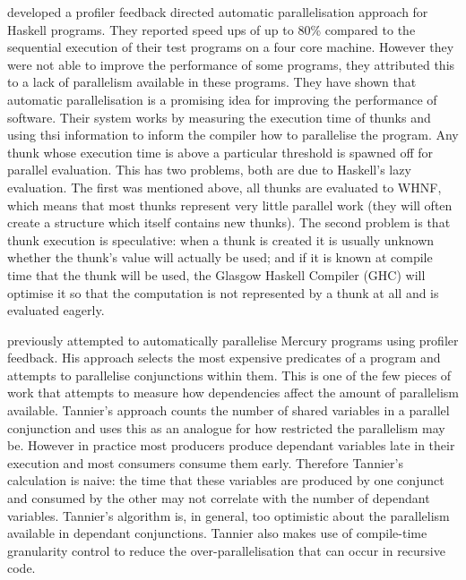 \citet*{harris_07_feedback_imp_par} developed a profiler
feedback directed automatic parallelisation approach for Haskell programs.
They reported speed ups of up to 80\% compared to the sequential
execution of their test programs on a four core machine.
However they were not able to improve the performance of some
programs, they attributed this to a lack of parallelism
available in these programs.
They have shown that automatic parallelisation is a promising idea for
improving the performance of software.
Their system works by measuring the execution time of thunks and using
thsi information to inform the compiler how to parallelise the program.
Any thunk whose execution time is above a particular threshold is
spawned off for parallel evaluation.
This has two problems, both are due to Haskell's lazy evaluation.
The first was mentioned above, all thunks are evaluated to WHNF,
which means that most thunks represent very little parallel work
(they will often create a structure which itself contains new thunks).
The second problem is that thunk execution is speculative:
when a thunk is created it is usually unknown whether the thunk's value
will actually be used;
and if it is known at compile time that the thunk will be used,
the Glasgow Haskell Compiler (GHC) will optimise it so that the computation
is not represented by a thunk at all and is evaluated eagerly.

\citet*{tannier:2007:parallel_mercury} previously attempted to automatically
parallelise Mercury programs using profiler feedback.
His approach selects the most expensive predicates
of a program and attempts to parallelise conjunctions within them.
This is one of the few pieces of work that attempts to measure how
dependencies affect the amount of parallelism available.
Tannier's approach counts the number of shared variables in a parallel
conjunction and uses this as an analogue for how restricted the
parallelism may be.
However in practice most producers produce dependant variables late in
their execution and most consumers consume them early.
Therefore Tannier's calculation is naive:
the time that these variables are produced by one conjunct and consumed
by the other may not correlate with the number of dependant variables.
Tannier's algorithm is, in general, too optimistic
about the parallelism available in dependant conjunctions.
Tannier also makes use of compile-time granularity control to reduce the
over-parallelisation that can occur in recursive code.

